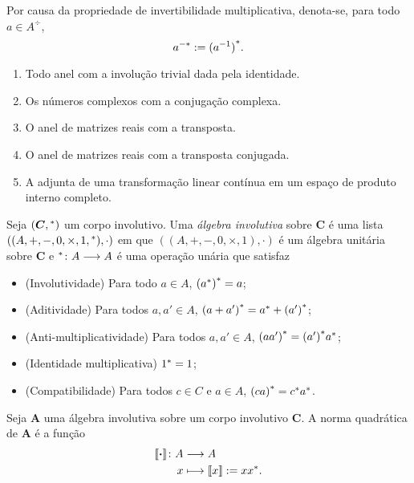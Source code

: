\begin{notation}
Por causa da propriedade de invertibilidade multiplicativa, denota-se, para todo $a \in A^{\div}$,
	\begin{equation*}
	{a}^{-{\ast}} := {(a^{-1})}^{\ast}.
	\end{equation*}
\end{notation}


\begin{example}
	\begin{enumerate}
	\item Todo anel com a involução trivial dada pela identidade.
	\item Os números complexos com a conjugação complexa.
	\item O anel de matrizes reais com a transposta.
	\item O anel de matrizes reais com a transposta conjugada.
	\item A adjunta de uma transformação linear contínua em um espaço de produto interno completo.
	\end{enumerate}
\end{example}

\begin{definition}
Seja $(\bm C,{}^{\ast})$ um corpo involutivo. Uma \emph{álgebra involutiva} sobre $\bm C$ é uma lista $((A,+,-,0,\times,1,{}^{\ast}),\cdot)$ em que $((A,+,-,0,\times,1),\cdot)$ é um álgebra unitária sobre $\bm C$ e ${{}^{\ast}}\colon {A} \longrightarrow {A}$ é uma operação unária que satisfaz
	\begin{itemize}
	\item (Involutividade) Para todo $a \in A$, ${({a}^{\ast})}^{\ast} = a$;
	\item (Aditividade) Para todos $a,a' \in A$, ${(a+a')}^{\ast} = {a}^{\ast} + {(a')}^{\ast}$;
	\item (Anti-multiplicatividade) Para todos $a,a' \in A$, ${(aa')}^{\ast} = {(a')}^{\ast}{a}^{\ast}$;
	\item (Identidade multiplicativa) ${1}^{\ast} = 1$;
	\item (Compatibilidade) Para todos $c \in C$ e $a \in A$, ${(ca)}^{\ast} = {c}^{\ast}{a}^{\ast}$.
	\end{itemize}
\end{definition}

\begin{definition}
Seja $\bm A$ uma álgebra involutiva sobre um corpo involutivo $\bm C$. A norma quadrática de $\bm A$ é a função
	\begin{align*}
	{\left\llbracket{\bm{\cdot}}\right\rrbracket}\colon {A} &\longrightarrow {A} \\{x} &\longmapsto \left\llbracket{x}\right\rrbracket := x{x}^{\ast}.
	\end{align*}
\end{definition}

